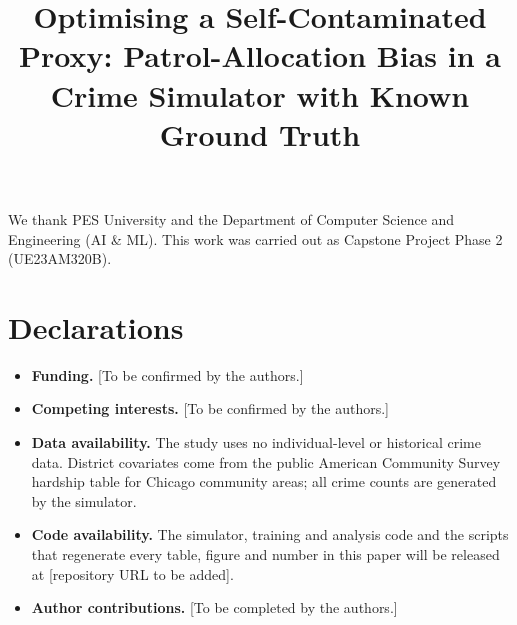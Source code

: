 \documentclass[pdflatex,sn-mathphys-num]{sn-jnl}
\begin{document}
\title[Optimising a Self-Contaminated Proxy]{Optimising a Self-Contaminated
Proxy: Patrol-Allocation Bias in a Crime Simulator with Known Ground Truth}

\author[1]{ }
\author[1]{ }
\author[1]{ }
\author[1]{ }
\author[1]{ }


\abstract{}


\maketitle



\backmatter

We thank PES University and the Department of Computer Science and Engineering
(AI \& ML). This work was carried out as Capstone Project Phase 2 (UE23AM320B).

\section*{Declarations}

\begin{itemize}
\item \textbf{Funding.} [To be confirmed by the authors.]
\item \textbf{Competing interests.} [To be confirmed by the authors.]
\item \textbf{Data availability.} The study uses no individual-level or
historical crime data. District covariates come from the public American
Community Survey hardship table for Chicago community areas; all crime counts
are generated by the simulator.
\item \textbf{Code availability.} The simulator, training and analysis code and
the scripts that regenerate every table, figure and number in this paper will
be released at [repository URL to be added].
\item \textbf{Author contributions.} [To be completed by the authors.]
\end{itemize}


\end{document}
